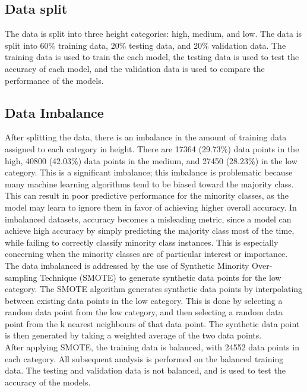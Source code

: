 \documentclass[12pt]{article}
\begin{document}
\vspace{20pt}

\subsection{Data split}
\noindent
The data is split into three height categories: high, medium, and low. The data is split into 60\% training data, 20\% testing data, and 20\% validation data. The training data is used to train the each model, the testing data is used to test the accuracy of each model, and the validation data is used to compare the performance of the models. 

\vspace{20pt}

\subsection{Data Imbalance}
\noindent
After splitting the data, there is an imbalance in the amount of training data assigned to each category in height. There are 17364 (29.73\%) data points in the high, 40800 (42.03\%) data points in the medium, and 27450 (28.23\%) in the low category. This is a significant imbalance; this imbalance is problematic because many machine learning algorithms tend to be biased toward the majority class. This can result in poor predictive performance for the minority classes, as the model may learn to ignore them in favor of achieving higher overall accuracy. In imbalanced datasets, accuracy becomes a misleading metric, since a model can achieve high accuracy by simply predicting the majority class most of the time, while failing to correctly classify minority class instances. This is especially concerning when the minority classes are of particular interest or importance.
\\
The data imbalanced is addressed by the use of Synthetic Minority Over-sampling Technique (SMOTE) to generate synthetic data points for the low category. The SMOTE algorithm generates synthetic data points by interpolating between existing data points in the low category. This is done by selecting a random data point from the low category, and then selecting a random data point from the k nearest neighbours of that data point. The synthetic data point is then generated by taking a weighted average of the two data points.
\\
After applying SMOTE, the training data is balanced, with 24552 data points in each category. All subsequent analysis is performed on the balanced training data. The testing and validation data is not balanced, and is used to test the accuracy of the models.
 
\end{document}
